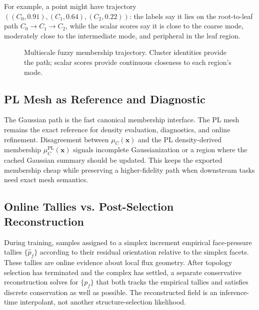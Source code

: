 \documentclass[11pt]{article}
\theoremstyle{definition}
\theoremstyle{plain}
\begin{document}
For example, a point might have trajectory $((C_0,0.91),(C_1,0.64),(C_2,0.22))$: the labels say it lies on the root-to-leaf path $C_0\to C_1\to C_2$, while the scalar scores say it is close to the coarse mode, moderately close to the intermediate mode, and peripheral in the leaf region.

\begin{figure}[t]
    \centering
    \caption{Multiscale fuzzy membership trajectory. Cluster identities provide the path; scalar scores provide continuous closeness to each region's mode.}
    \label{fig:membership-trajectory}
\end{figure}

\subsection{PL Mesh as Reference and Diagnostic}
The Gaussian path is the fast canonical membership interface. The PL mesh remains the exact reference for density evaluation, diagnostics, and online refinement. Disagreement between $\mu_C(\mathbf x)$ and the PL density-derived membership $\mu_C^{\mathrm{PL}}(\mathbf x)$ signals incomplete Gaussianization or a region where the cached Gaussian summary should be updated. This keeps the exported membership cheap while preserving a higher-fidelity path when downstream tasks need exact mesh semantics.

\subsection{Online Tallies vs. Post-Selection Reconstruction}
During training, samples assigned to a simplex increment empirical face-pressure tallies $\{\hat p_f\}$ according to their residual orientation relative to the simplex facets. These tallies are online evidence about local flux geometry. After topology selection has terminated and the complex has settled, a separate conservative reconstruction solves for $\{p_f\}$ that both tracks the empirical tallies and satisfies discrete conservation as well as possible. The reconstructed field is an inference-time interpolant, not another structure-selection likelihood.
\end{document}
